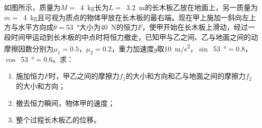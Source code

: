 如图所示，质量为\(M =\) \,\qty{4}{kg}长为\(L =\) \,\qty{3.2}{m}的长木板乙放在地面上，另一质量为\(m =\) \,\qty{4}{kg}且可视为质点的物体甲放在长木板的最右端。现在甲上施加一斜向左上方与水平方向成\(\theta =\)\qty{53}{\degree}大小为\qty{40}{N}的恒力\(F\)，使甲开始在长木板上滑动，经过一段时间甲运动到长木板的中点时将恒力撤走，已知甲与乙之间、乙与地面之间的动摩擦因数分别为\(\mu_1 = 0.5\)，\(\mu_2 = 0.2\)，重力加速度\(g\)取\qty{10}{m/s^2}，\(\sin\) \,\qty{53}{\degree}\(= 0.8\)，\(\cos\) \,\qty{53}{\degree}\(= 0.6\)。求：
\begin{enumerate}
	\item 施加恒力\(F\)时，甲乙之间的摩擦力\(f_1\)的大小和方向和乙与地面之间的摩擦力\(f_2\)的大小和方向；
	\item 撤去恒力瞬间，物体甲的速度；
	\item 整个过程长木板乙的位移。
\end{enumerate}
\begin{answer}
    
\end{answer}
